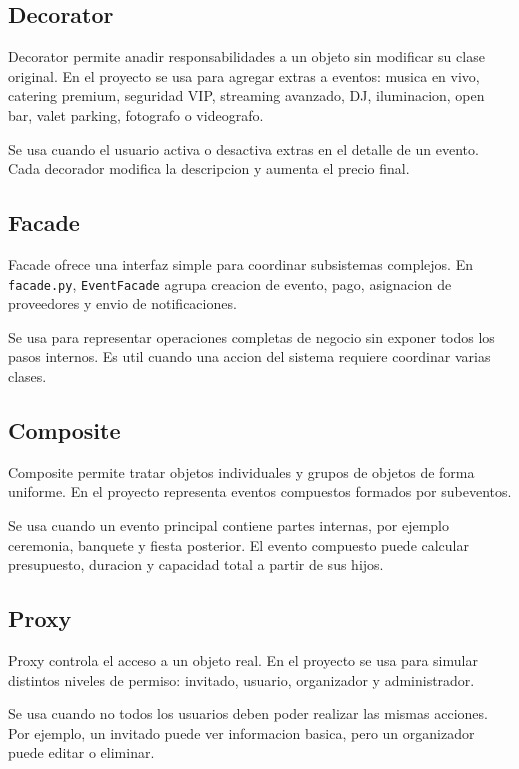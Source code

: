 \documentclass[12pt,a4paper]{article}
\begin{document}
\subsection{Decorator}

Decorator permite anadir responsabilidades a un objeto sin modificar su clase original. En el proyecto se usa para agregar extras a eventos: musica en vivo, catering premium, seguridad VIP, streaming avanzado, DJ, iluminacion, open bar, valet parking, fotografo o videografo.

Se usa cuando el usuario activa o desactiva extras en el detalle de un evento. Cada decorador modifica la descripcion y aumenta el precio final.

\subsection{Facade}

Facade ofrece una interfaz simple para coordinar subsistemas complejos. En \texttt{facade.py}, \texttt{EventFacade} agrupa creacion de evento, pago, asignacion de proveedores y envio de notificaciones.

Se usa para representar operaciones completas de negocio sin exponer todos los pasos internos. Es util cuando una accion del sistema requiere coordinar varias clases.

\subsection{Composite}

Composite permite tratar objetos individuales y grupos de objetos de forma uniforme. En el proyecto representa eventos compuestos formados por subeventos.

Se usa cuando un evento principal contiene partes internas, por ejemplo ceremonia, banquete y fiesta posterior. El evento compuesto puede calcular presupuesto, duracion y capacidad total a partir de sus hijos.

\subsection{Proxy}

Proxy controla el acceso a un objeto real. En el proyecto se usa para simular distintos niveles de permiso: invitado, usuario, organizador y administrador.

Se usa cuando no todos los usuarios deben poder realizar las mismas acciones. Por ejemplo, un invitado puede ver informacion basica, pero un organizador puede editar o eliminar.
\end{document}
